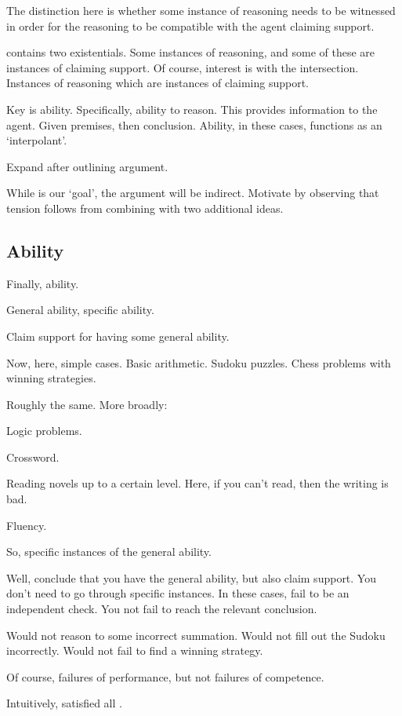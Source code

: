 \begin{note}
  The distinction here is whether some instance of reasoning needs to be witnessed in order for the reasoning to be compatible with the agent claiming support.

  \EAS{} contains two existentials.
  Some instances of reasoning, and some of these are instances of claiming support.
  Of course, interest is with the intersection.
  Instances of reasoning which are instances of claiming support.

  Key is ability.
  Specifically, ability to reason.
  This provides information to the agent.
  Given premises, then conclusion.
  Ability, in these cases, functions as an `interpolant'.

  Expand after outlining argument.
\end{note}

\begin{note}
  While \EAS{} is our `goal', the argument will be indirect.
  Motivate \EAS{} by observing that tension follows from combining \USE{} with two additional ideas.
\end{note}

\subsection{Ability}
\label{sec:ability}

\begin{note}
  Finally, ability.

  General ability, specific ability.

  Claim support for having some general ability.

  Now, here, simple cases.
  Basic arithmetic.
  Sudoku puzzles.
  Chess problems with winning strategies.

  Roughly the same.
  More broadly:

  Logic problems.

  Crossword.

  Reading novels up to a certain level.
  Here, if you can't read, then the writing is bad.

  Fluency.

  So, specific instances of the general ability.
\end{note}

\begin{note}
  Well, conclude that you have the general ability, but also claim support.
  You don't need to go through specific instances.
  In these cases, fail to be an independent check.
  You not fail to reach the relevant conclusion.

  Would not reason to some incorrect summation.
  Would not fill out the Sudoku incorrectly.
  Would not fail to find a winning strategy.

  Of course, failures of performance, but not failures of competence.

  Intuitively, satisfied all .
\end{note}


